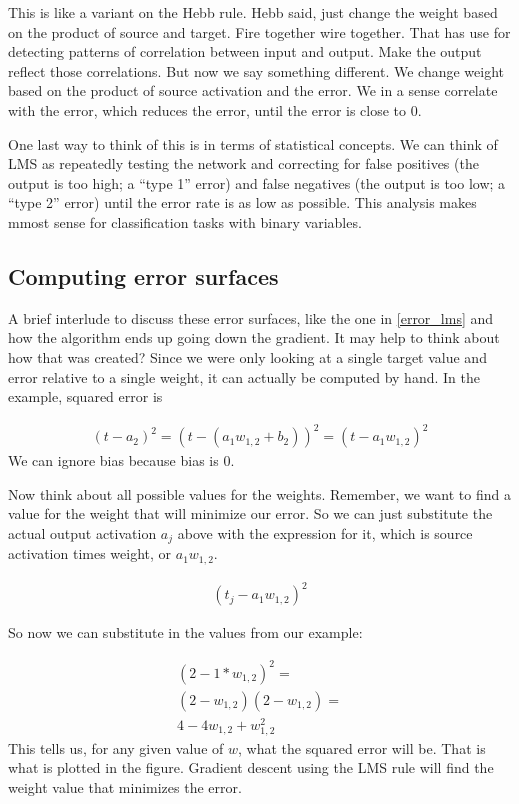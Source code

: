 This is like a variant on the Hebb rule. Hebb said, just change the weight based on the product of source and target. Fire together wire together. That has use for detecting patterns of correlation between input and output. Make the output reflect those correlations. But now we say something different. We change weight based on the product of source activation and the error. We in a sense correlate with the error, which reduces the error, until the error is close to 0.

One last way to think of this is in terms of statistical concepts. We can think of LMS as repeatedly testing the network and correcting for false positives (the output is too high; a ``type 1'' error) and false negatives (the output is too low; a ``type 2'' error) until the error rate is as low as possible. This analysis makes mmost sense for classification tasks with binary variables.
 \subsection{Computing error surfaces}

A brief interlude to discuss these error surfaces, like the one in \ref{error_lms} and how the algorithm ends up going down the gradient. It may help to think about how that was created? Since we were only looking at a single target value and error relative to a single weight, it can actually be computed by hand. In the example, squared error is

\begin{eqnarray*}
(t - a_2)^2 =  (t - (a_1 w_{1,2} + b_2))^2 = (t - a_1 w_{1,2})^2  
\end{eqnarray*}
We can ignore bias because bias is 0.

Now think about all possible values for the weights. Remember, we want to find a value for the weight that will minimize our error. So we can just substitute the actual output activation $a_j$ above with the expression for it, which is source activation times weight, or  $a_1 w_{1,2}$.

\begin{eqnarray*}
(t_j - a_1 w_{1,2})^2
\end{eqnarray*}

So now we can substitute in the values from our example:

\begin{eqnarray*}
(2 - 1 * w_{1,2})^2 = \\
(2 - w_{1,2}) (2 - w_{1,2} ) =  \\
4-4w_{1,2}+w_{1,2}^2
\end{eqnarray*}
This tells us, for any given value of $w$, what the squared error will be. That is what is plotted in the figure. Gradient descent using the LMS rule will find the weight value that minimizes the error.

